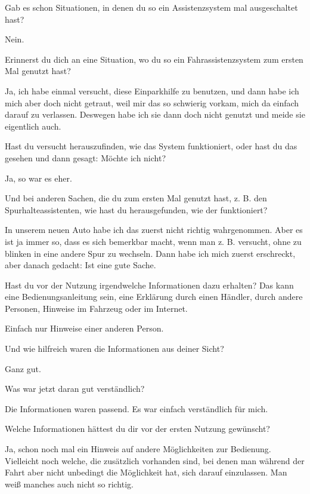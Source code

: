 \interviewerin
Gab es schon Situationen, in denen du so ein Assistenzsystem mal
ausgeschaltet hast?

Nein.

\interviewerin
Erinnerst du dich an eine Situation, wo du so ein Fahrassistenzsystem
zum ersten Mal genutzt hast?

Ja, ich habe einmal versucht, diese Einparkhilfe zu benutzen, und dann
habe ich mich aber doch nicht getraut, weil mir das so schwierig
vorkam, mich da einfach darauf zu verlassen. Deswegen habe ich sie dann
doch nicht genutzt und meide sie eigentlich auch.

\interviewerin
Hast du versucht herauszufinden, wie das System funktioniert, oder hast
du das gesehen und dann gesagt: Möchte ich nicht?

Ja, so war es eher.

\interviewerin
Und bei anderen Sachen, die du zum ersten Mal genutzt hast, z. B. den
Spurhalteassistenten, wie hast du herausgefunden, wie der funktioniert?

In unserem neuen Auto habe ich das zuerst nicht richtig wahrgenommen.
Aber es ist ja immer so, dass es sich bemerkbar macht, wenn man z. B.
versucht, ohne zu blinken in eine andere Spur zu wechseln. Dann habe
ich mich zuerst erschreckt, aber danach gedacht: Ist eine gute Sache.

\interviewerin
Hast du vor der Nutzung irgendwelche Informationen dazu erhalten? Das
kann eine Bedienungsanleitung sein, eine Erklärung durch einen Händler,
durch andere Personen, Hinweise im Fahrzeug oder im Internet.

Einfach nur Hinweise einer anderen Person.

\interviewerin
Und wie hilfreich waren die Informationen aus deiner Sicht?

Ganz gut.

\interviewerin
Was war jetzt daran gut verständlich?

Die Informationen waren passend. Es war einfach verständlich für mich.

\interviewerin
Welche Informationen hättest du dir vor der ersten Nutzung gewünscht?

Ja, schon noch mal ein Hinweis auf andere Möglichkeiten zur Bedienung.
Vielleicht noch welche, die zusätzlich vorhanden sind, bei denen man
während der Fahrt aber nicht unbedingt die Möglichkeit hat, sich darauf
einzulassen. Man weiß manches auch nicht so richtig.

